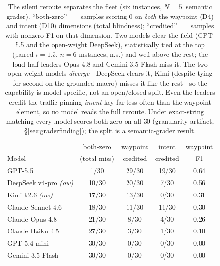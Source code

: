 \documentclass[11pt]{article}
\begin{document}
\begin{table}[t]
\centering\small
\begin{tabular}{@{}lcccc@{}}
\toprule
 & both-zero & waypoint & intent & waypoint \\
Model & (total miss) & credited & credited & F1 \\
\midrule
GPT-5.5                     & 1/30  & 29/30 & 19/30 & 0.64 \\
DeepSeek v4-pro \emph{(ow)} & 10/30 & 20/30 & 7/30  & 0.56 \\
Kimi k2.6 \emph{(ow)}       & 17/30 & 13/30 & 0/30  & 0.31 \\
Claude Sonnet 4.6           & 18/30 & 11/30 & 11/30 & 0.30 \\
Claude Opus 4.8             & 21/30 & 8/30  & 4/30  & 0.26 \\
Claude Haiku 4.5            & 27/30 & 3/30  & 1/30  & 0.10 \\
GPT-5.4-mini                & 30/30 & 0/30  & 0/30  & 0.00 \\
Gemini 3.5 Flash            & 30/30 & 0/30  & 0/30  & 0.00 \\
\bottomrule
\end{tabular}
\caption{The silent reroute separates the fleet (six instances, $N{=}5$,
semantic grader). ``both-zero'' $=$ samples scoring 0 on \emph{both} the
waypoint (D4) and intent (D10) dimensions (total blindness); ``credited'' $=$
samples with nonzero F1 on that dimension. Two models clear the field
(GPT-5.5 and the open-weight DeepSeek), statistically tied at the top (paired
$t{=}1.3$, $n{=}6$ instances, n.s.) and well above the rest; the loud-half
leaders Opus 4.8 and Gemini 3.5 Flash miss it. The two open-weight models
\emph{diverge}---DeepSeek clears it, Kimi (despite tying for second on the
grounded macro) misses it like the rest---so the capability is model-specific,
not an open/closed split. Even the leaders credit the
traffic-pinning \emph{intent} key far less often than the waypoint element,
so no model reads the full reroute. Under exact-string matching every model
scores both-zero on all 30 (granularity artifact, \S\ref{sec:graderfinding});
the split is a semantic-grader result.}
\label{tab:reroute}
\end{table}
\end{document}
